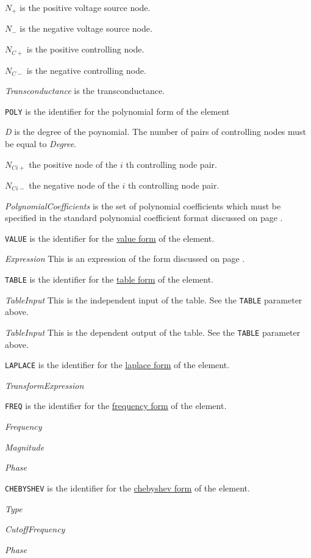 \begin{widelist}
\item[$N_{+}$] is the positive voltage source node.
\item[$N_{-}$] is the negative voltage source node.
\item[$N_{C+}$] is the positive controlling node.
\item[$N_{C-}$] is the negative controlling  node.
\item[{\it Transconductance}] is the transconductance.
\item[{\tt POLY}] is the identifier for the polynomial form of the element
\item[{\it D}] is the degree of the poynomial. The number of pairs of
           controlling nodes must be equal to {\it Degree}.
\item[$N_{Ci+}$] the positive node of the $i$ th controlling node pair.
\item[$N_{Ci-}$] the negative node of the $i$ th controlling node pair.
\item[{\it PolynomialCoefficients}] is the set of polynomial coefficients
which must be specified in the standard polynomial coefficient format
discussed on page \pageref{section:poly}.
\item[{\tt VALUE}]
is the identifier for the \underline{value form} of the element.
\item[{\it Expression}] This is an expression of the form discussed on
page \pageref{section:poly}.
\item[{\tt TABLE}]
is the identifier for the \underline{table form} of the element.
\item[{\it TableInput}] This is the independent input of the table.
See the {\tt TABLE} parameter above.
\item[{\it TableInput}] This is the dependent output of the table.
See the {\tt TABLE} parameter above.
\item[{\tt LAPLACE}]
is the identifier for the \underline{laplace form} of the element.
\item[{\it TransformExpression}]
\item[{\tt FREQ}]
is the identifier for the \underline{frequency form} of the element.
\item[{\it Frequency}]
\item[{\it Magnitude}]
\item[{\it Phase}]
\item[{\tt CHEBYSHEV}]
is the identifier for the \underline{chebyshev form} of the element.
\item[{\it Type}]
\item[{\it CutoffFrequency}]
\item[{\it Phase}]
\end{widelist}

